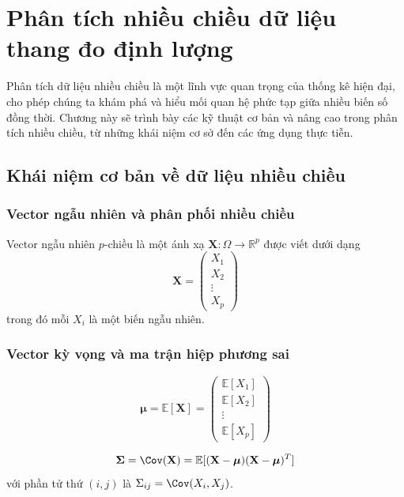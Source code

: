 \chapter{Phân tích nhiều chiều dữ liệu thang đo định lượng}

Phân tích dữ liệu nhiều chiều là một lĩnh vực quan trọng của thống kê hiện đại, cho phép chúng ta khám phá và hiểu mối quan hệ phức tạp giữa nhiều biến số đồng thời. Chương này sẽ trình bày các kỹ thuật cơ bản và nâng cao trong phân tích nhiều chiều, từ những khái niệm cơ sở đến các ứng dụng thực tiễn.

\section{Khái niệm cơ bản về dữ liệu nhiều chiều}

\subsection{Vector ngẫu nhiên và phân phối nhiều chiều}
\begin{dn}
Vector ngẫu nhiên $p$-chiều là một ánh xạ $\mathbf{X}: \Omega \to \mathbb{R}^p$ được viết dưới dạng
\[
\mathbf{X} = \begin{pmatrix} X_1 \\ X_2 \\ \vdots \\ X_p \end{pmatrix}
\]
trong đó mỗi $X_i$ là một biến ngẫu nhiên.
\end{dn}

\subsection{Vector kỳ vọng và ma trận hiệp phương sai}
\begin{dn}
\[
\boldsymbol{\mu} = \mathbb{E}[\mathbf{X}] = \begin{pmatrix} \mathbb{E}[X_1] \\ \mathbb{E}[X_2] \\ \vdots \\ \mathbb{E}[X_p] \end{pmatrix}
\]
\end{dn}

\begin{dn}
\[
\boldsymbol{\Sigma} = \Cov(\mathbf{X}) = \mathbb{E}[(\mathbf{X} - \boldsymbol{\mu})(\mathbf{X} - \boldsymbol{\mu})^T]
\]
với phần tử thứ $(i,j)$ là $\Sigma_{ij} = \Cov(X_i, X_j)$.
\end{dn}

